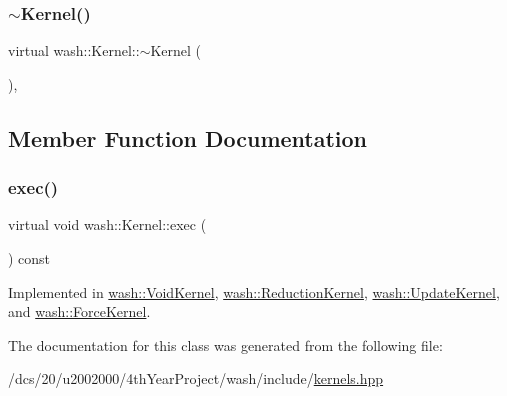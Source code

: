 \subsubsection{\texorpdfstring{$\sim$\+Kernel()}{~Kernel()}}
{\footnotesize\ttfamily virtual wash\+::\+Kernel\+::$\sim$\+Kernel (\begin{DoxyParamCaption}{ }\end{DoxyParamCaption})\hspace{0.3cm}{\ttfamily [virtual]}, {\ttfamily [default]}}



\subsection{Member Function Documentation}
\mbox{\label{classwash_1_1Kernel_a0ec211840402ce975997b22136f16e39}} 
\subsubsection{\texorpdfstring{exec()}{exec()}}
{\footnotesize\ttfamily virtual void wash\+::\+Kernel\+::exec (\begin{DoxyParamCaption}{ }\end{DoxyParamCaption}) const\hspace{0.3cm}{\ttfamily [pure virtual]}}



Implemented in \mbox{\hyperlink{classwash_1_1VoidKernel_a2a271788509bac47a96dbbecd7fbe90e}{wash\+::\+Void\+Kernel}}, \mbox{\hyperlink{classwash_1_1ReductionKernel_a3ead90df8748700f40b2e6820e8e7e91}{wash\+::\+Reduction\+Kernel}}, \mbox{\hyperlink{classwash_1_1UpdateKernel_a72ec6b0ea453d97708f3fcfd98970366}{wash\+::\+Update\+Kernel}}, and \mbox{\hyperlink{classwash_1_1ForceKernel_aa815514d4e9af5ebb056dbe8f1d5a720}{wash\+::\+Force\+Kernel}}.



The documentation for this class was generated from the following file\+:\begin{DoxyCompactItemize}
\item 
/dcs/20/u2002000/4th\+Year\+Project/wash/include/\mbox{\hyperlink{kernels_8hpp}{kernels.\+hpp}}\end{DoxyCompactItemize}

